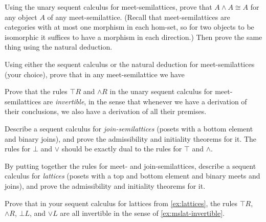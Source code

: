 \documentclass{book}
\let\meet\wedge
\def\meetR{\mathord{\meet}R}
\let\join\vee
\begin{document}
\begin{ex}\label{ex:mslat-idem}
  Using the unary sequent calculus for meet-semilattices, prove that $A\meet A \cong A$ for any object $A$ of any meet-semilattice.
  (Recall that meet-semilattices are categories with at most one morphism in each hom-set, so for two objects to be isomorphic it suffices to have a morphism in each direction.)
  Then prove the same thing using the natural deduction.
\end{ex}

\begin{ex}\label{ex:mslat-monoid}
  Using either the sequent calculus or the natural deduction for meet-semilattices (your choice), prove that in any meet-semilattice we have
\end{ex}

\begin{ex}\label{ex:mslat-invertible}
  Prove that the rules $\top R$ and $\meetR$ in the unary sequent calculus for meet-semilattices are \emph{invertible}, in the sense that whenever we have a derivation of their conclusions, we also have a derivation of all their premises.
\end{ex}

\begin{ex}\label{ex:jslat}
  Describe a sequent calculus for \emph{join-semilattices} (posets with a bottom element and binary joins), and prove the admissibility and initiality theorems for it.
  The rules for $\bot$ and $\join$ should be exactly dual to the rules for $\top$ and $\meet$.
\end{ex}

\begin{ex}\label{ex:lattices}
  By putting together the rules for meet- and join-semilattices, describe a sequent calculus for \emph{lattices} (posets with a top and bottom element and binary meets and joins), and prove the admissibility and initiality theorems for it.
\end{ex}

\begin{ex}\label{ex:lattices-invertible}
  Prove that in your sequent calculus for lattices from \cref{ex:lattices}, the rules $\top R$, $\meet R$, $\bot L$, and $\join L$ are all invertible in the sense of \cref{ex:mslat-invertible}.
\end{ex}
\end{document}
